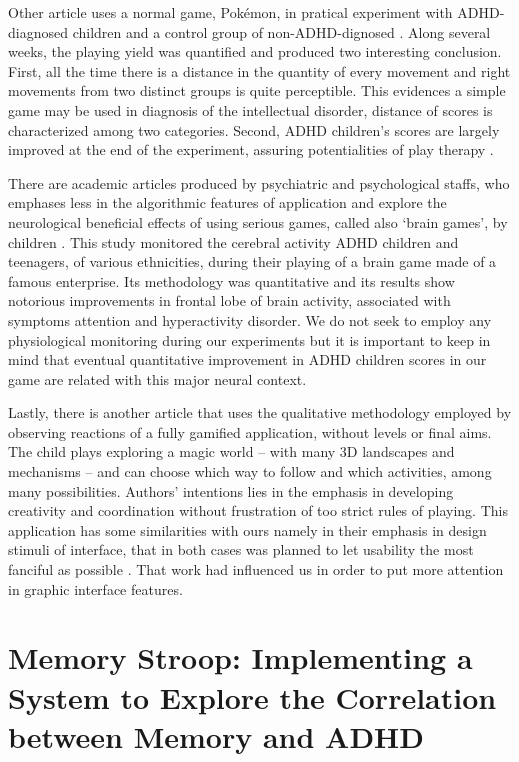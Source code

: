 Other article uses a normal game, Pok\'{e}mon, in pratical experiment with ADHD-diagnosed children and a control group of non-ADHD-dignosed \citep{ADHDGames}. Along several weeks, the playing yield was quantified and produced two interesting conclusion. First, all the time there is a distance in the quantity of every movement and right movements from two distinct groups is quite perceptible. This evidences a simple game may be used in diagnosis of the intellectual disorder, distance of scores is characterized among two categories. Second, ADHD children's scores are largely improved at the end of the experiment, assuring potentialities of play therapy \citep{ADHDGames}.



There are academic articles produced by psychiatric and psychological staffs, who emphases less in the algorithmic features of application and explore the neurological beneficial effects of using serious games, called also `brain games', by children \citep{brainGames}. This study monitored the cerebral activity ADHD children and teenagers, of various ethnicities, during their playing of a brain game made of a famous enterprise. Its methodology was quantitative and its results show notorious improvements in frontal lobe of brain activity, associated with symptoms attention and hyperactivity disorder. We do not seek to employ any physiological monitoring during our experiments but it is important to keep in mind that eventual quantitative improvement in ADHD children scores in our game are related with this major neural context. 



Lastly, there is another article \citep{design} that uses the qualitative methodology employed by observing reactions of a fully gamified application, without levels or final aims. The child plays exploring a magic world -- with many 3D landscapes and mechanisms -- and can choose which way to follow and which activities, among many possibilities. Authors' intentions lies in the emphasis in developing creativity and coordination without frustration of too strict rules of playing. This application has some similarities with ours namely in their emphasis in design stimuli of interface, that in both cases was planned to let usability the most fanciful as possible \citep{design}. That work had influenced us in order to put more attention in graphic interface features.



\section{Memory Stroop: Implementing a System to Explore the Correlation between Memory and ADHD}




